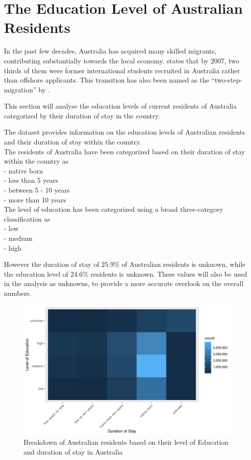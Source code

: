 \documentclass[11pt,a4paper,]{article}
\begin{document}
\section* {The Education Level of Australian Residents}

In the past few decades, Australia has acquired many skilled migrants, contributing substantially towards the local economy. \textcite{hawthorne2010valuable} states that by 2007, two thirds of them were former international students recruited in Australia rather than offshore applicants. This transition has also been named as the ``two-step-migration'' by \textcite{hawthorne2010valuable}.

This section will analyse the education levels of current residents of Australia categorized by their duration of stay in the country.

The dataset provides information on the education levels of Australian residents and their duration of stay within the country.\\
The residents of Australia have been categorized based on their duration of stay within the country as\\
- native born\\
- less than 5 years\\
- between 5 - 10 years\\
- more than 10 years\\
The level of education has been categorized using a broad three-category classification as\\
- low\\
- medium\\
- high

However the duration of stay of 25.9\% of Australian residents is unknown, while the education level of 24.6\% residents is unknown. These values will also be used in the analysis as unknowns, to provide a more accurate overlook on the overall numbers.

\begin{figure}
\centering
\includegraphics{ETC5513assignment4_files/figure-latex/tile-plot-edu-vs-duration-1.pdf}
\caption{\label{fig:tile-plot-edu-vs-duration}Breakdown of Australian residents based on their level of Education and duration of stay in Australia}
\end{figure}
\end{document}
